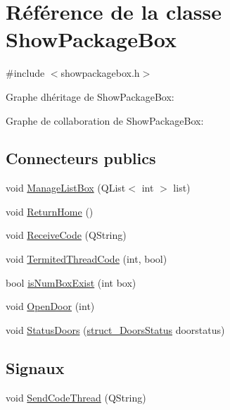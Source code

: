 \hypertarget{class_show_package_box}{}\section{Référence de la classe Show\+Package\+Box}
\label{class_show_package_box}


{\ttfamily \#include $<$showpackagebox.\+h$>$}



Graphe d\textquotesingle{}héritage de Show\+Package\+Box\+:


Graphe de collaboration de Show\+Package\+Box\+:
\subsection*{Connecteurs publics}
\begin{DoxyCompactItemize}
\item 
void \hyperlink{class_show_package_box_ae789285d39aeeff73b2cfd3b090ba7fd}{Manage\+List\+Box} (Q\+List$<$ int $>$ list)
\item 
void \hyperlink{class_show_package_box_a0a4f481ad113ea596093ecacd412b95e}{Return\+Home} ()
\item 
void \hyperlink{class_show_package_box_ae836ec3cfd267de84b896c52e25a16c6}{Receive\+Code} (Q\+String)
\item 
void \hyperlink{class_show_package_box_a440c7677694289f7ffeb5f6a074ca398}{Termited\+Thread\+Code} (int, bool)
\item 
bool \hyperlink{class_show_package_box_acc97f2decd9e3c2697ac8f4cedf3b427}{is\+Num\+Box\+Exist} (int box)
\item 
void \hyperlink{class_show_package_box_a26a928cd147cffb7f57a80c05a027bcc}{Open\+Door} (int)
\item 
void \hyperlink{class_show_package_box_a17fb42d146b66265a24ab479f9e72243}{Status\+Doors} (\hyperlink{structstruct___doors_status}{struct\+\_\+\+Doors\+Status} doorstatus)
\end{DoxyCompactItemize}
\subsection*{Signaux}
\begin{DoxyCompactItemize}
\item 
void \hyperlink{class_show_package_box_a6493888de6400f3b27c9eecef3e59710}{Send\+Code\+Thread} (Q\+String)
\end{DoxyCompactItemize}
